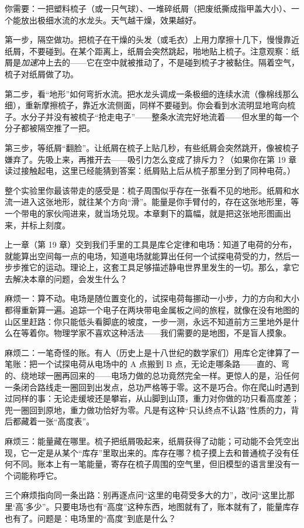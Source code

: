 
\begin{experiment}
你需要：一把塑料梳子（或一只气球）、一堆碎纸屑（把废纸撕成指甲盖大小）、一个能放出极细水流的水龙头。天气越干燥，效果越好。

第一步，隔空做功。把梳子在干燥的头发（或毛衣）上用力摩擦十几下，慢慢靠近纸屑，不要碰到。在某个距离上，纸屑会突然跳起，啪地贴上梳子。注意观察：纸屑是\emph{加速}冲上去的——它在空中就被推动了，不是碰到梳子才被黏住。隔着空气，梳子对纸屑做了功。

第二步，看“地形”如何弯折水流。把水龙头调成一条极细的连续水流（像棉线那么细），重新摩擦梳子，靠近水流侧面，同样不要碰到。你会看到水流明显地弯向梳子。水分子并没有被梳子“抢走电子”——整条水流完好地流着——但水里的每一个分子都被隔空推了一把。

第三步，等纸屑“翻脸”。让纸屑在梳子上贴几秒，有些纸屑会突然跳开，像被梳子嫌弃了。先吸上来，再推开去——吸引力怎么变成了排斥力？（如果你在第 19 章读过接触起电，这里已经能猜到答案：纸屑贴上后从梳子那里分到了同种电荷。）

整个实验里你最该带走的感受是：梳子周围似乎存在一张看不见的地形。纸屑和水流一进入这张地形，就往某个方向“滑”。能量是你手臂付的，存在这张地形里，等一个带电的家伙闯进来，就当场兑现。本章剩下的篇幅，就是把这张地形图画出来，并标上刻度。
\end{experiment}


\begin{mainline}
上一章（第 19 章）交到我们手里的工具是库仑定律和电场：知道了电荷的分布，就能算出空间每一点的电场，知道电场就能算出任何一个试探电荷受的力，然后一步步推它的运动。理论上，这套工具足够描述静电世界里发生的一切。那么，拿它去解决本章的问题，会发生什么？

麻烦一：算不动。电场是随位置变化的，试探电荷每挪动一小步，力的方向和大小都得重新算一遍。追踪一个电子在两块带电金属板之间的旅程，就像在没有地图的山区里赶路：你只能低头看脚底的坡度，一步一测，永远不知道前方三里地外是什么在等着你。物理学家不喜欢这种活法——我们需要的是地图，不是盲人摸象。

麻烦二：一笔奇怪的账。有人（历史上是十八世纪的数学家们）用库仑定律算了一笔账：把一个试探电荷从电场中的 A 点搬到 B 点，无论走哪条路——直的、弯的、绕地球一圈再回来的——电场力做的总功竟然完全一样。更惊人的是，沿任何一条闭合路线走一圈回到出发点，总功严格等于零。这不是巧合。你在爬山时遇到过同样的事：无论走缓坡还是攀岩，从山脚到山顶，重力对你做的功只看高度差；兜一圈回到原地，重力做功恰好为零。凡是有这种“只认终点不认路”性质的力，背后都藏着一张“高度表”。

麻烦三：能量藏在哪里。梳子把纸屑吸起来，纸屑获得了动能；可动能不会凭空出现，它一定是从某个“库存”里取出来的。库存在哪？梳子摸上去和普通梳子没有任何不同。账本上有一笔能量，寄存在梳子周围的空气里，但旧模型的语言里没有一个词能称呼它。

三个麻烦指向同一条出路：别再逐点问“这里的电荷受多大的力”，改问“这里比那里‘高’多少”。只要电场也有“高度”这种东西，地图就有了，账本就有了，能量库存也有了。问题是：电场里的“高度”到底是什么？
\end{mainline}

